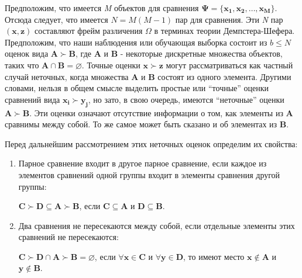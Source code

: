 \documentclass[12pt,a4paper,oneside]{article}
\begin{document}
\par
Предположим, что имеется \emph{M} объектов для сравнения \(\mathbf{\Psi} = \{\mathbf{x_1}, \mathbf{x_2}, \dots, \mathbf{x_M}\}\). 
Отсюда следует, что имеется \(N = M(M - 1)\) пар для сравнения. 
Эти \emph{N} пар \((\mathbf{x}, \mathbf{z})\) составляют фрейм различения \(\Omega\) в терминах теории Демпстера-Шефера. 
Предположим, что наши наблюдения или обучающая выборка состоит из \(b \leq N\) оценок вида \(\mathbf{A} \succ \mathbf{B}\), где \(\mathbf{A}\) и \(\mathbf{B}\) - некоторые дискретные множества объектов, таких что \(\mathbf{A} \cap \mathbf{B} = \varnothing\).  
Точные оценки \(\mathbf{x} \succ \mathbf{z}\) могут рассматриваться как частный случай неточных, когда множества \(\mathbf{A}\) и \(\mathbf{B}\) состоят из одного элемента. 
Другими словами, нельзя в общем смысле выделить простые или ``точные'' оценки сравнений вида \(\mathbf{x_i} \succ \mathbf{y_j}\), но зато, в свою очередь, имеются ``неточные'' оценки \(\mathbf{A} \succ \mathbf{B}\). 
Эти оценки означают отсутствие информации о том, как элементы из \(\mathbf{A}\) сравнимы между собой. 
То же самое может быть сказано и об элементах из \(\mathbf{B}\). 

\par
Перед дальнейшим рассмотрением этих неточных оценок определим их свойства:

\begin{enumerate}
\item Парное сравнение входит в другое парное сравнение, если каждое из элементов сравнений одной группы входит в элементы сравнения другой группы:

\begin{center}
\(\mathbf{C} \succ \mathbf{D} \subseteq \mathbf{A} \succ \mathbf{B}\), если \(\mathbf{C} \subseteq \mathbf{A}\) и \(\mathbf{D} \subseteq \mathbf{B}\).
\end{center}

\item Два сравнения не пересекаются между собой, если отдельные элементы этих сравнений не пересекаются:

\begin{center}
\(\mathbf{C} \succ \mathbf{D} \cap \mathbf{A} \succ \mathbf{B} = \varnothing\), если \(\forall\mathbf{x} \in \mathbf{C}\) и \(\forall\mathbf{y} \in \mathbf{D}\), то имеют место \(\mathbf{x} \notin \mathbf{A}\) и \(\mathbf{y} \notin \mathbf{B}\).
\end{center}

\end{enumerate}
\end{document}
